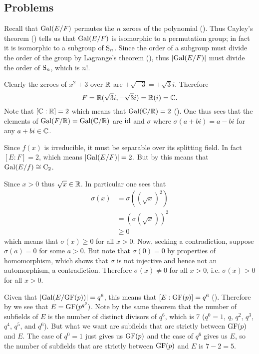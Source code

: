 \subsection*{Problems}
\begin{questions}
    \item Recall that $\mathrm{Gal}(E/F)$ permutes the $n$ zeroes of the polynomial (). Thus Cayley's theorem () tells us that $\mathrm{Gal}(E/F)$ is isomorphic to a permutation group; in fact it is isomorphic to a subgroup of $\mathrm{S}_{n}$. Since the order of a subgroup must divide the order of the group by Lagrange's theorem (), thus $|\mathrm{Gal}(E/F)|$ must divide the order of $\mathrm{S}_{n}$, which is $n!$.

    \item Clearly the zeroes of $x^2 + 3$ over $\mathbb{R}$ are $\pm\sqrt{-3} = \pm\sqrt3i$. Therefore
    \[
        F = \mathbb{R}(\sqrt3i, -\sqrt3i) = \mathbb{R}(i) = \mathbb{C}.
    \]
    Note that $[\mathbb{C}:\mathbb{R}] = 2$ which means that $\mathrm{Gal}(\mathbb{C}/\mathbb{R}) = 2$ (). One thus sees that the elements of $\mathrm{Gal}(F/\mathbb{R}) = \mathrm{Gal}(\mathbb{C}/\mathbb{R})$ are $\mathrm{id}$ and $\sigma$ where $\sigma(a + bi) = a - bi$ for any $a + bi \in \mathbb{C}$.

    \item Since $f(x)$ is irreducible, it must be separable over its splitting field. In fact $[E:F] = 2$, which means $|\mathrm{Gal}(E/F)| = 2$. But by  this means that $\mathrm{Gal}(E/f) \cong \mathrm{C}_{2}$.

    \item Since $x > 0$ thus $\sqrt x \in \mathbb{R}$. In particular one sees that
    \begin{align*}
        \sigma(x) &= \sigma\left((\sqrt x)^2\right)\\
        &= \left(\sigma(\sqrt x)\right)^2\\
        &\geq 0
    \end{align*}
    which means that $\sigma(x) \geq 0$ for all $x > 0$. Now, seeking a contradiction, suppose $\sigma(a) = 0$ for some $a > 0$. But note that $\sigma(0) = 0$ by properties of homomorphism, which shows that $\sigma$ is not injective and hence not an automorphism, a contradiction. Therefore $\sigma(x) \neq 0$ for all $x > 0$, i.e. $\sigma(x) > 0$ for all $x > 0$.

    \item Given that $|\mathrm{Gal}(E/\mathrm{GF}(p))| = q^6$, this means that $[E:\mathrm{GF}(p)] = q^6$ (). Therefore by  we see that $E = \mathrm{GF}(p^{q^6})$. Note by the same theorem that the number of subfields of $E$ is the number of distinct divisors of $q^6$, which is 7 ($q^0 = 1$, $q$, $q^2$, $q^3$, $q^4$, $q^5$, and $q^6$). But what we want are subfields that are strictly between $\mathrm{GF}(p)$ and $E$. The case of $q^0 = 1$ just gives us $\mathrm{GF}(p)$ and the case of $q^6$ gives us $E$, so the number of subfields that are strictly between $\mathrm{GF}(p)$ and $E$ is $7 - 2 = 5$.


\end{questions}
